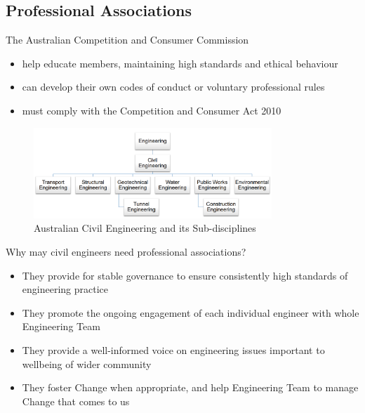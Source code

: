 \documentclass{report}
\begin{document}
	\subsection{Professional Associations}
	The Australian Competition and Consumer Commission
	\begin{itemize}
		\item help educate members, maintaining high standards and ethical behaviour
		\item can develop their own codes of conduct or voluntary professional rules
		\item must comply with the Competition and Consumer Act 2010
	\end{itemize}

	\begin{figure}[htbp]
		\centering
		\includegraphics[width=0.8\textwidth]{images/figures/ENGDIS.png}
		\caption{Australian Civil Engineering and its Sub-disciplines}
		\label{fig:your_label}
	\end{figure}

	Why may civil engineers need professional associations?

	\begin{itemize}
		\item They provide for stable governance to ensure consistently high standards of engineering practice
		\item They promote the ongoing engagement of each individual engineer with whole Engineering Team
		\item They provide a well-informed voice on engineering issues important to wellbeing of wider community
		\item They foster Change when appropriate, and help Engineering Team to manage Change that comes to us
	\end{itemize}

	\newpage
\end{document}

